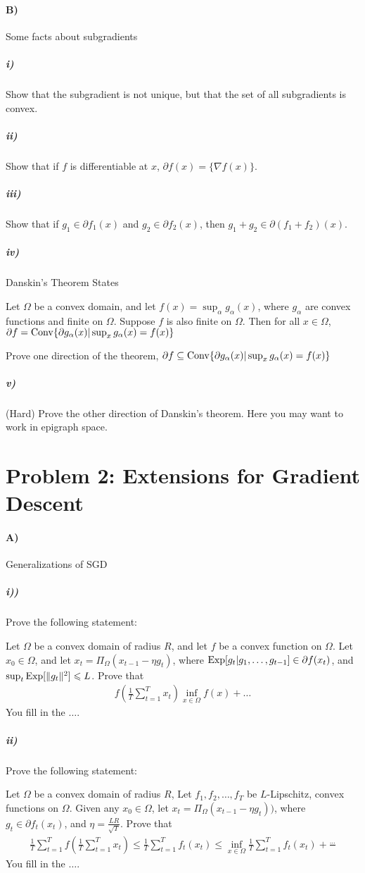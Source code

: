 \documentclass[12pt]{article}
\begin{document}
\paragraph{B)} Some facts about subgradients

\subparagraph{i)} Show that the subgradient is not unique, but that the set of all subgradients is convex.

\subparagraph{ii)} Show that if $f$ is differentiable at $x$, $\partial f(x) = \{\nabla f(x)\}$. 

\subparagraph{iii)} Show that if $g_1 \in \partial f_1(x)$ and $g_2 \in \partial f_2(x)$, then $g_1 + g_2 \in \partial(f_1 + f_2)(x)$. 


\subparagraph{iv)} Danskin's Theorem States
\begin{theorem*}[Danskin] Let $\Omega$ be a convex domain, and let $f(x) = \sup_{\alpha} g_{\alpha}(x)$, where $g_{\alpha}$ are convex functions and finite on $\Omega$. Suppose $f$ is also finite on $\Omega$. Then for all $x \in \Omega$, $\partial f = \mathrm{Conv} \{\partial g_{\alpha}(x) | \sup_{x} g_{\alpha}(x) =f(x) \}$
\end{theorem*}
Prove one direction of the theorem, $\partial f \subseteq \mathrm{Conv} \{\partial g_{\alpha}(x) | \sup_{x} g_{\alpha}(x) =f(x) \}$


\subparagraph{v)} (Hard) Prove the other direction of Danskin's theorem. Here you may want to work in epigraph space. 

\section*{Problem 2: Extensions for Gradient Descent}
\paragraph{A)} Generalizations of SGD
\subparagraph{i))} Prove the following statement:
\begin{proposition*} Let $\Omega$ be a convex domain of radius $R$, and let $f$ be a convex function on $\Omega$. Let $x_0 \in \Omega$, and let $x_{t} = \Pi_{\Omega}(x_{t-1} - \eta g_t )$, where $\mathrm{Exp}[g_t | g_1,\dots,g_{t-1}] \in \partial f(x_t)$, and $\sup_{t} \mathrm{Exp}[\|g_t\|^2] \leqslant L$.  Prove that 
\begin{eqnarray}
 f(\frac{1}{T}\sum_{t=1}^T x_t) \inf_{x \in \Omega} f(x) + \dots
\end{eqnarray}
You fill in the $\dots$.
\end{proposition*}
\subparagraph{ii)} Prove the following statement:
\begin{proposition*}  Let $\Omega$ be a convex domain of radius $R$, Let $f_1,f_2,\dots,f_T$ be $L$-Lipschitz, convex functions on $\Omega$. Given any $x_0 \in \Omega$, let $x_{t} = \Pi_{\Omega}(x_{t-1} - \eta g_t ))$, where $g_t \in \partial f_t(x_t)$, and  $\eta = \frac{LR}{\sqrt{T}}$. Prove that
\begin{eqnarray}
\frac{1}{T}\sum_{t=1}^{T} f(\frac{1}{T}\sum_{t=1}^T x_t) \le \frac{1}{T}\sum_{t=1}^Tf_t(x_t) \le \inf_{x \in \Omega}\frac{1}{T}\sum_{t=1}^Tf_t(x_t) + \frac{\dots}{}
\end{eqnarray}
You fill in the $\dots$.
\end{proposition*}
\end{document}
